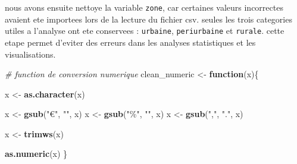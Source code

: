 \documentclass[
]{article}
\newenvironment{Shaded}{\begin{snugshade}}{\end{snugshade}}
\newcommand{\AttributeTok}[1]{\textcolor[rgb]{0.13,0.29,0.53}{#1}}
\newcommand{\CommentTok}[1]{\textcolor[rgb]{0.56,0.35,0.01}{\textit{#1}}}
\newcommand{\ControlFlowTok}[1]{\textcolor[rgb]{0.13,0.29,0.53}{\textbf{#1}}}
\newcommand{\FunctionTok}[1]{\textcolor[rgb]{0.13,0.29,0.53}{\textbf{#1}}}
\newcommand{\NormalTok}[1]{#1}
\newcommand{\OtherTok}[1]{\textcolor[rgb]{0.56,0.35,0.01}{#1}}
\newcommand{\SpecialCharTok}[1]{\textcolor[rgb]{0.81,0.36,0.00}{\textbf{#1}}}
\newcommand{\StringTok}[1]{\textcolor[rgb]{0.31,0.60,0.02}{#1}}
\begin{document}
nous avons ensuite nettoye la variable \texttt{zone}, car certaines
valeurs incorrectes avaient ete importees lors de la lecture du fichier
csv. seules les trois categories utiles a l'analyse ont ete conservees :
\texttt{urbaine}, \texttt{periurbaine} et \texttt{rurale}. cette etape
permet d'eviter des erreurs dans les analyses statistiques et les
visualisations.

\begin{Shaded}
\end{Shaded}

\begin{Shaded}
\begin{Highlighting}[]
\CommentTok{\# function de conversion numerique}
\NormalTok{clean\_numeric }\OtherTok{\textless{}{-}} \ControlFlowTok{function}\NormalTok{(x)\{}

\NormalTok{  x }\OtherTok{\textless{}{-}} \FunctionTok{as.character}\NormalTok{(x)}

\NormalTok{  x }\OtherTok{\textless{}{-}} \FunctionTok{gsub}\NormalTok{(}\StringTok{"€"}\NormalTok{, }\StringTok{""}\NormalTok{, x)}
\NormalTok{  x }\OtherTok{\textless{}{-}} \FunctionTok{gsub}\NormalTok{(}\StringTok{"\%"}\NormalTok{, }\StringTok{""}\NormalTok{, x)}
\NormalTok{  x }\OtherTok{\textless{}{-}} \FunctionTok{gsub}\NormalTok{(}\StringTok{","}\NormalTok{, }\StringTok{"."}\NormalTok{, x)}

\NormalTok{  x }\OtherTok{\textless{}{-}} \FunctionTok{trimws}\NormalTok{(x)}

  \FunctionTok{as.numeric}\NormalTok{(x)}
\NormalTok{\}}
\end{Highlighting}
\end{Shaded}
\end{document}
